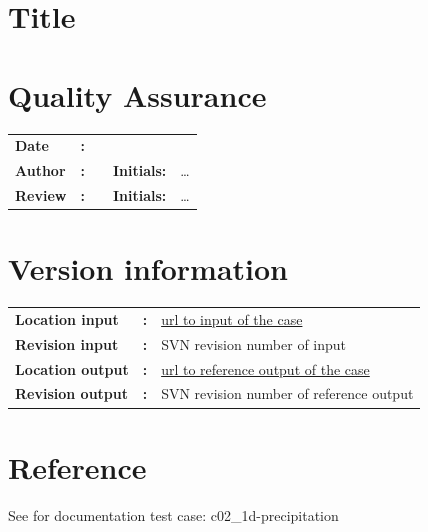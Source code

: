 

\section{Title}
\newrefsegment

\section*{Quality Assurance}
\begin{tabular}{@{}p{27mm}@{}p{0mm}p{\textwidth-52mm-48pt}p{15mm}p{10mm}}
\textbf{Date} & \textbf{:} &   \\ 
\textbf{Author} & \textbf{:} &   & \textbf{Initials:} & \ldots \\
\textbf{Review} & \textbf{:} &   & \textbf{Initials:} & \ldots 
\end{tabular}

\section*{Version information}
{{
\begin{tabular}{@{}p{27mm}@{}p{0mm}p{\textwidth-27mm-24pt}}
\textbf{Location input}     & \textbf{:} & \url{url to input of the case} \\
\textbf{Revision input} & \textbf{:} & SVN revision number of input \\
\textbf{Location output}     & \textbf{:} & \url{url to reference output of the case} \\
\textbf{Revision output} & \textbf{:} & SVN revision number of reference output
\end{tabular}
}}

\section*{Reference}
See for documentation test case: c02_1d-precipitation

\printrefsegment

